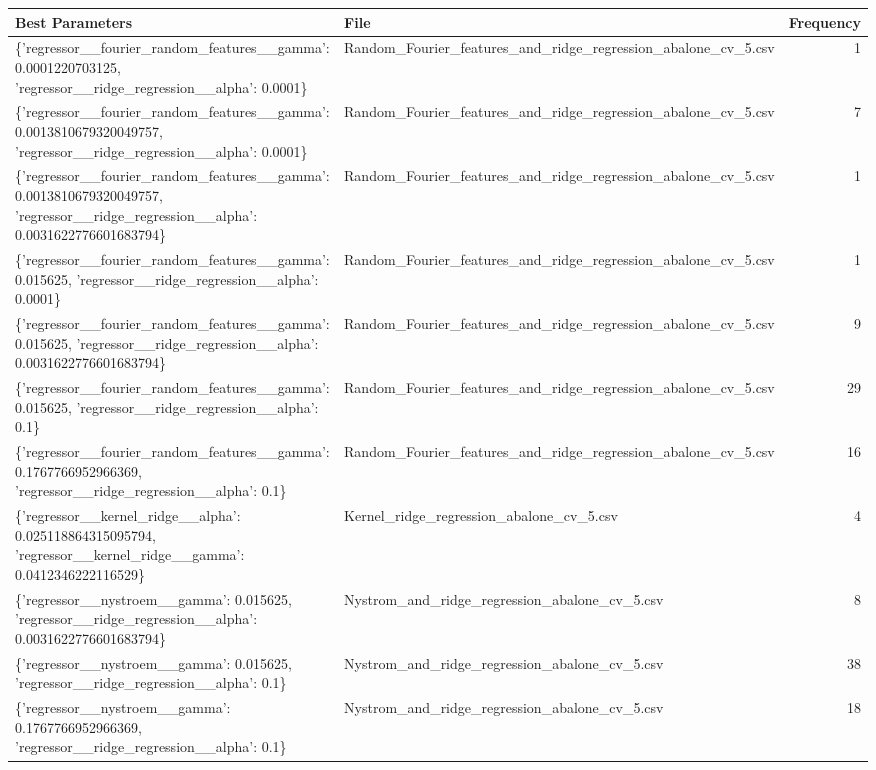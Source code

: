 \begin{tabularx}{\textwidth}{llr}
\toprule
                                                                                                                  Best Parameters &                                                          File &  Frequency \\
\midrule
                     \{'regressor\_\_fourier\_random\_features\_\_gamma': 0.0001220703125, 'regressor\_\_ridge\_regression\_\_alpha': 0.0001\} & Random\_Fourier\_features\_and\_ridge\_regression\_abalone\_cv\_5.csv &          1 \\
               \{'regressor\_\_fourier\_random\_features\_\_gamma': 0.0013810679320049757, 'regressor\_\_ridge\_regression\_\_alpha': 0.0001\} & Random\_Fourier\_features\_and\_ridge\_regression\_abalone\_cv\_5.csv &          7 \\
\{'regressor\_\_fourier\_random\_features\_\_gamma': 0.0013810679320049757, 'regressor\_\_ridge\_regression\_\_alpha': 0.0031622776601683794\} & Random\_Fourier\_features\_and\_ridge\_regression\_abalone\_cv\_5.csv &          1 \\
                            \{'regressor\_\_fourier\_random\_features\_\_gamma': 0.015625, 'regressor\_\_ridge\_regression\_\_alpha': 0.0001\} & Random\_Fourier\_features\_and\_ridge\_regression\_abalone\_cv\_5.csv &          1 \\
             \{'regressor\_\_fourier\_random\_features\_\_gamma': 0.015625, 'regressor\_\_ridge\_regression\_\_alpha': 0.0031622776601683794\} & Random\_Fourier\_features\_and\_ridge\_regression\_abalone\_cv\_5.csv &          9 \\
                               \{'regressor\_\_fourier\_random\_features\_\_gamma': 0.015625, 'regressor\_\_ridge\_regression\_\_alpha': 0.1\} & Random\_Fourier\_features\_and\_ridge\_regression\_abalone\_cv\_5.csv &         29 \\
                     \{'regressor\_\_fourier\_random\_features\_\_gamma': 0.1767766952966369, 'regressor\_\_ridge\_regression\_\_alpha': 0.1\} & Random\_Fourier\_features\_and\_ridge\_regression\_abalone\_cv\_5.csv &         16 \\
                   \{'regressor\_\_kernel\_ridge\_\_alpha': 0.025118864315095794, 'regressor\_\_kernel\_ridge\_\_gamma': 0.0412346222116529\} &                      Kernel\_ridge\_regression\_abalone\_cv\_5.csv &          4 \\
                            \{'regressor\_\_nystroem\_\_gamma': 0.015625, 'regressor\_\_ridge\_regression\_\_alpha': 0.0031622776601683794\} &                 Nystrom\_and\_ridge\_regression\_abalone\_cv\_5.csv &          8 \\
                                              \{'regressor\_\_nystroem\_\_gamma': 0.015625, 'regressor\_\_ridge\_regression\_\_alpha': 0.1\} &                 Nystrom\_and\_ridge\_regression\_abalone\_cv\_5.csv &         38 \\
                                    \{'regressor\_\_nystroem\_\_gamma': 0.1767766952966369, 'regressor\_\_ridge\_regression\_\_alpha': 0.1\} &                 Nystrom\_and\_ridge\_regression\_abalone\_cv\_5.csv &         18 \\
\bottomrule
\end{tabularx}

